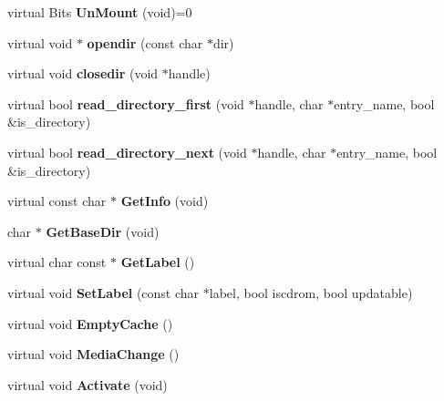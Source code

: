 \begin{DoxyCompactItemize}
\item 
\hypertarget{classDOS__Drive_aef7bc7c1cbf09e4fe88ee8bc7435db07}{virtual Bits {\bfseries Un\-Mount} (void)=0}\label{classDOS__Drive_aef7bc7c1cbf09e4fe88ee8bc7435db07}

\item 
\hypertarget{classDOS__Drive_ae382ad86607e9926893e78af7231ec61}{virtual void $\ast$ {\bfseries opendir} (const char $\ast$dir)}\label{classDOS__Drive_ae382ad86607e9926893e78af7231ec61}

\item 
\hypertarget{classDOS__Drive_af52e4214f17f23c70751df925582ba12}{virtual void {\bfseries closedir} (void $\ast$handle)}\label{classDOS__Drive_af52e4214f17f23c70751df925582ba12}

\item 
\hypertarget{classDOS__Drive_ac595d4546118da9910b2f736b7af1c41}{virtual bool {\bfseries read\-\_\-directory\-\_\-first} (void $\ast$handle, char $\ast$entry\-\_\-name, bool \&is\-\_\-directory)}\label{classDOS__Drive_ac595d4546118da9910b2f736b7af1c41}

\item 
\hypertarget{classDOS__Drive_aaf4039f2a7830fab1b0c8603542f9f31}{virtual bool {\bfseries read\-\_\-directory\-\_\-next} (void $\ast$handle, char $\ast$entry\-\_\-name, bool \&is\-\_\-directory)}\label{classDOS__Drive_aaf4039f2a7830fab1b0c8603542f9f31}

\item 
\hypertarget{classDOS__Drive_a64bf9af6eca73f8071c109a2d4c25d02}{virtual const char $\ast$ {\bfseries Get\-Info} (void)}\label{classDOS__Drive_a64bf9af6eca73f8071c109a2d4c25d02}

\item 
\hypertarget{classDOS__Drive_abbaeec032c93d0f14760b12f39386eec}{char $\ast$ {\bfseries Get\-Base\-Dir} (void)}\label{classDOS__Drive_abbaeec032c93d0f14760b12f39386eec}

\item 
\hypertarget{classDOS__Drive_a8e239d9aa134597f38505b39b8ca8016}{virtual char const $\ast$ {\bfseries Get\-Label} ()}\label{classDOS__Drive_a8e239d9aa134597f38505b39b8ca8016}

\item 
\hypertarget{classDOS__Drive_a20d9aa48e274a59070f10d949802a4b2}{virtual void {\bfseries Set\-Label} (const char $\ast$label, bool iscdrom, bool updatable)}\label{classDOS__Drive_a20d9aa48e274a59070f10d949802a4b2}

\item 
\hypertarget{classDOS__Drive_a2ec8efe8d1b50b3c8a7b3bde52000e0e}{virtual void {\bfseries Empty\-Cache} ()}\label{classDOS__Drive_a2ec8efe8d1b50b3c8a7b3bde52000e0e}

\item 
\hypertarget{classDOS__Drive_aceabb46a487741d6c63241539811e80d}{virtual void {\bfseries Media\-Change} ()}\label{classDOS__Drive_aceabb46a487741d6c63241539811e80d}

\item 
\hypertarget{classDOS__Drive_a1007125b58463bbffb07d890fd6f1c61}{virtual void {\bfseries Activate} (void)}\label{classDOS__Drive_a1007125b58463bbffb07d890fd6f1c61}

\end{DoxyCompactItemize}

